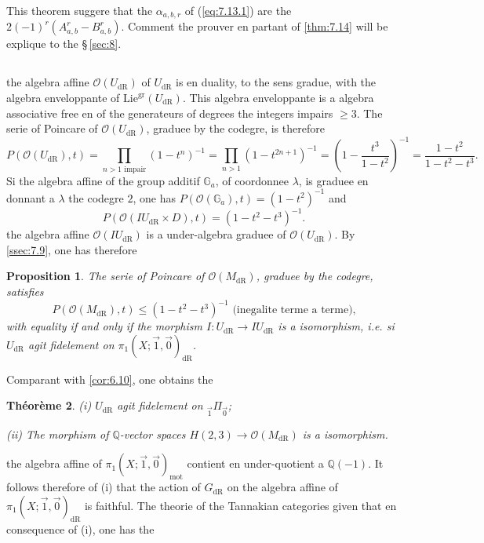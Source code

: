 \documentclass[11pt,a4paper]{article}
\theoremstyle{plain}
\newtheorem{theorem}{Th\'eor\`eme}
\newtheorem{proposition}[theorem]{Proposition}
\theoremstyle{definition}
\newcommand{\Q}{\mathbb{Q}}
\newcommand{\Ga}{\mathbb{G}_a}
\newcommand{\dR}{\mathrm{dR}}
\newcommand{\mot}{\mathrm{mot}}
\newcommand{\gr}{\mathrm{gr}}
\begin{document}
This theorem suggere that the $\alpha_{a,b,r}$ of (\ref{eq:7.13.1}) are the $2(-1)^r (A_{a,b}^r - B_{a,b}^r)$. Comment the prouver en partant of \ref{thm:7.14} will be explique to the \S\,\ref{sec:8}.

\subsection{}\label{ssec:7.15}

the algebra affine $\mathcal{O}(U_{\dR})$ of $U_{\dR}$ is en duality, to the sens gradue, with the algebra enveloppante of $\mathrm{Lie}^{\gr}(U_{\dR})$. This algebra enveloppante is a algebra associative free en of the generateurs of degrees the integers impairs $\geq 3$. The serie of Poincare of $\mathcal{O}(U_{\dR})$, graduee by the codegre, is therefore
\[
P(\mathcal{O}(U_{\dR}),t) = \prod_{n>1 \text{ impair}} (1 - t^n)^{-1} = \prod_{n>1} (1 - t^{2n+1})^{-1} = \left(1 - \frac{t^3}{1-t^2}\right)^{-1} = \frac{1-t^2}{1-t^2-t^3}.
\]
Si the algebra affine of the group additif $\Ga$, of coordonnee $\lambda$, is graduee en donnant a $\lambda$ the codegre $2$, one has $P(\mathcal{O}(\Ga),t) = (1-t^2)^{-1}$ and
\[
P(\mathcal{O}(IU_{\dR} \times D),t) = (1-t^2-t^3)^{-1}.
\]
the algebra affine $\mathcal{O}(IU_{\dR})$ is a under-algebra graduee of $\mathcal{O}(U_{\dR})$. By \ref{ssec:7.9}, one has therefore

\begin{proposition}\label{prop:7.16}
The serie of Poincare of $\mathcal{O}(M_{\dR})$, graduee by the codegre, satisfies
\begin{equation}\label{eq:7.16.1}
P(\mathcal{O}(M_{\dR}),t) \leq (1-t^2-t^3)^{-1} \text{ (inegalite terme a terme),}
\end{equation}
with equality if and only if the morphism $I: U_{\dR} \to IU_{\dR}$ is a isomorphism, i.e. si $U_{\dR}$ agit fidelement on $\pi_1(X;\vec{1},\vec{0})_{\dR}$.
\end{proposition}

Comparant with \ref{cor:6.10}, one obtains the

\begin{theorem}\label{thm:7.17}
(i) $U_{\dR}$ agit fidelement on ${}_{\vec{1}}\Pi_{\vec{0}}$;

(ii) The morphism of $\Q$-vector spaces $H(2,3) \to \mathcal{O}(M_{\dR})$ is a isomorphism.
\end{theorem}

the algebra affine of $\pi_1(X;\vec{1},\vec{0})_{\mot}$ contient en under-quotient a $\Q(-1)$. It follows therefore of (i) that the action of $G_{\dR}$ on the algebra affine of $\pi_1(X;\vec{1},\vec{0})_{\dR}$ is faithful. The theorie of the Tannakian categories given that en consequence of (i), one has the
\end{document}
